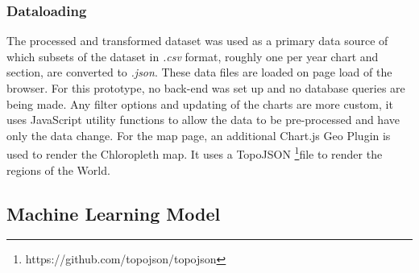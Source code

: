 \subsubsection{Dataloading}
The processed and transformed dataset was used as a primary data source of which subsets of the dataset in \textit{.csv} format, roughly one per year chart and section, are converted to \textit{.json}. These data files are loaded on page load of the browser. For this prototype, no back-end was set up and no database queries are being made. Any filter options and updating of the charts are more custom, it uses JavaScript utility functions to allow the data to be pre-processed and have only the data change. For the map page, an additional Chart.js Geo Plugin is used to render the Chloropleth map. It uses a TopoJSON \footnote{https://github.com/topojson/topojson}file to render the regions of the World.

\subsection{Machine Learning Model}
